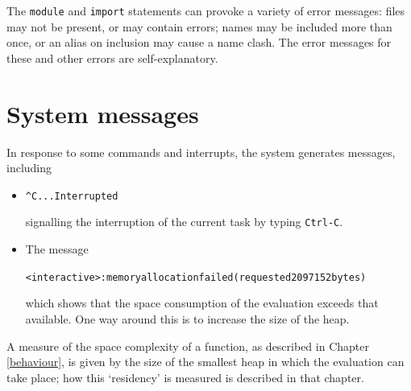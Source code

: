 The \texttt{module} and \texttt{import} statements can provoke a variety of
error messages: files may not be present, or may contain errors; names may be
included more than once, or an alias on inclusion may cause a name clash. The
error messages for these and other errors are self-explanatory.
\vspace{-8pt}

\section*{System messages}
\vspace{-5pt}

In response to some commands and interrupts, the system generates messages,
including
\begin{itemize}
\item
\begin{alltt}
\^{}C ... Interrupted
\end{alltt}
signalling the interruption of the current task by typing \texttt{Ctrl-C}.
\item
The message
\begin{alltt}
<interactive>: memory allocation failed (requested 2097152 bytes)
\end{alltt}
which shows that the space consumption of the evaluation exceeds that
available. One way around this is to increase the size of the heap. 
\end{itemize}

A measure of the space complexity of a function, as described in Chapter
\ref{behaviour}, is given by the size of the smallest heap in which the
evaluation can take place; how this `residency' is measured is described in that chapter.

%
